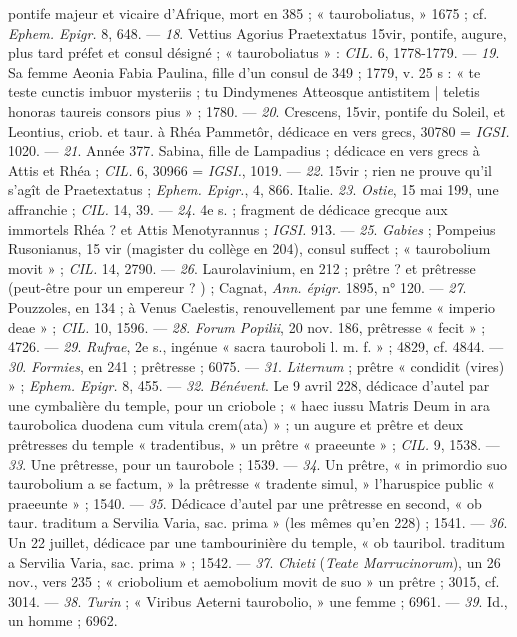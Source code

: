 \documentclass[a4paper, 11pt, oneside, polutonikogreek, french]{article}
\begin{document}
pontife majeur et vicaire d'Afrique, mort en 385 ; « tauroboliatus, » 1675 ; cf. \emph{Ephem. Epigr.} 8, 648. --- \emph{18}. Vettius Agorius Praetextatus 15vir, pontife, augure, plus tard préfet et consul désigné ; « tauroboliatus » : \emph{CIL.} 6, 1778-1779. --- \emph{19}. Sa femme Aeonia Fabia Paulina, fille d'un consul de 349 ; 1779, v. 25 s : « te teste cunctis imbuor mysteriis ; tu Dindymenes Atteosque antistitem | teletis honoras taureis consors pius » ; 1780. --- \emph{20}. Crescens, 15vir, pontife du Soleil, et Leontius, criob. et taur. à Rhéa Pammetôr, dédicace en vers grecs, 30780 = \emph{IGSI.} 1020. --- \emph{21}. Année 377. Sabina, fille de Lampadius ; dédicace en vers grecs à Attis et Rhéa ; \emph{CIL.} 6, 30966 = \emph{IGSI.}, 1019. --- \emph{22}. 15vir ; rien ne prouve qu'il s'agît de Praetextatus ; \emph{Ephem. Epigr.}, 4, 866.    
Italie. \emph{23}. \emph{Ostie}, 15 mai 199, une affranchie ; \emph{CIL.} 14, 39. --- \emph{24}. 4e s. ; fragment de dédicace grecque aux immortels Rhéa ? et Attis Menotyrannus ; \emph{IGSI.} 913. --- \emph{25}. \emph{Gabies} ; Pompeius Rusonianus, 15 vir (magister du collège en 204), consul suffect ; « taurobolium movit » ; \emph{CIL.} 14, 2790. --- \emph{26}. Laurolavinium, en 212 ; prêtre ? et prêtresse (peut-être pour un empereur ? ) ; Cagnat, \emph{Ann. épigr.} 1895, n° 120. --- \emph{27}. Pouzzoles, en 134 ; à Venus Caelestis, renouvellement par une femme « imperio deae » ; \emph{CIL.} 10, 1596. --- \emph{28}. \emph{Forum Popilii}, 20 nov. 186, prêtresse « fecit » ; 4726. --- \emph{29}. \emph{Rufrae}, 2e s., ingénue « sacra tauroboli l. m. f. » ; 4829, cf. 4844. --- \emph{30}. \emph{Formies}, en 241 ; prêtresse ; 6075. --- \emph{31}. \emph{Liternum} ; prêtre « condidit (vires) » ; \emph{Ephem. Epigr.} 8, 455. --- \emph{32}. \emph{Bénévent}. Le 9 avril 228, dédicace d'autel par une cymbalière du temple, pour un criobole ; « haec iussu Matris Deum in ara taurobolica duodena cum vitula crem(ata) » ; un augure et prêtre et deux prêtresses du temple « tradentibus, » un prêtre « praeeunte » ; \emph{CIL.} 9, 1538. --- \emph{33}. Une prêtresse, pour un taurobole ; 1539. --- \emph{34}. Un prêtre, « in primordio suo taurobolium a se factum, » la prêtresse « tradente simul, » l'haruspice public « praeeunte » ; 1540. --- \emph{35}. Dédicace d'autel par une prêtresse en second, « ob taur. traditum a Servilia Varia, sac. prima » (les mêmes qu'en 228) ; 1541. --- \emph{36}. Un 22 juillet, dédicace par une tambourinière du temple, « ob tauribol. traditum a Servilia Varia, sac. prima » ; 1542. --- \emph{37}. \emph{Chieti} (\emph{Teate Marrucinorum}), un 26 nov., vers 235 ; « criobolium et aemobolium movit de suo » un prêtre ; 3015, cf. 3014. --- \emph{38}. \emph{Turin} ; « Viribus Aeterni taurobolio, » une femme ; 6961. --- \emph{39}. Id., un homme ; 6962.  
\end{document}

